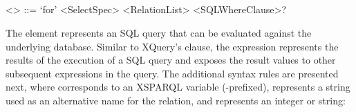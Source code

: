 \subsection{\SQLForClause}
\label{sec:syntax-rdb}
%
{\scriptsize 
  \begin{grammar}
    <\textbf{\SQLForClause}>    ::=  `for' <SelectSpec> <RelationList> <SQLWhereClause>?
  \end{grammar}
  \vspace{-.5\grammarparsep}%
}


\noindent The \SQLForClause element represents an \ac{SQL} \SELECT query that can be evaluated against the underlying
database.  Similar to XQuery's \FOR clause, the \SQLForClause expression represents the results of the execution of a
SQL query and exposes the result values to other subsequent expressions in the query.
%
\noindent The additional \SQLForClause syntax rules are presented next, where  corresponds to an XSPARQL
variable (\lit{\var{}}-prefixed),  represents a string used as an alternative name for the relation,
and  represents an integer or string:

